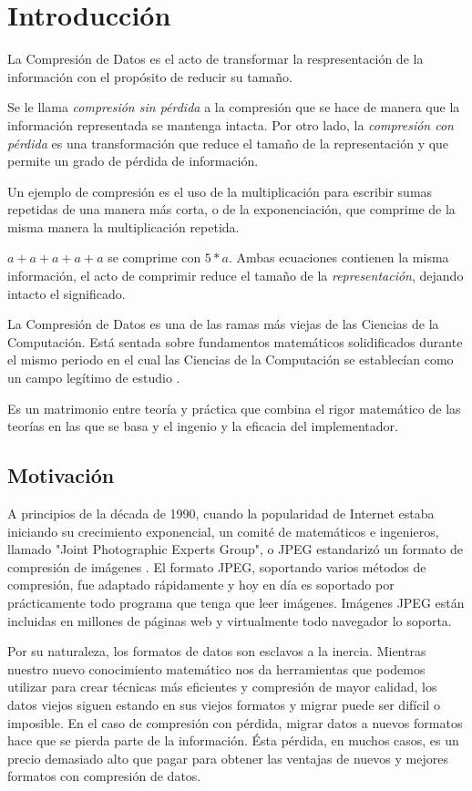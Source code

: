 \chapter{Introducción}\label{ch:introduction}


La \gls{Compresión de Datos} es el acto de transformar la respresentación de la
información con el propósito de reducir su tamaño.

Se le llama \emph{compresión sin pérdida} a la compresión que se hace de manera
que la información representada se mantenga intacta. Por otro lado, la
\emph{compresión con pérdida} es una transformación que reduce el tamaño de la
representación y que permite un grado de pérdida de información.

Un ejemplo de compresión es el uso de la multiplicación para escribir sumas
repetidas de una manera más corta, o de la exponenciación, que comprime de la
misma manera la multiplicación repetida.

$ a + a + a + a + a $ se comprime con $ 5 * a $. Ambas ecuaciones contienen la
misma información, el acto de comprimir reduce el tamaño de la
\emph{representación}, dejando intacto el significado.

La Compresión de Datos es una de las ramas más viejas de las Ciencias de la
Computación. Está sentada sobre fundamentos matemáticos solidificados durante
el mismo periodo en el cual las Ciencias de la Computación se establecían como
un campo legítimo de estudio \cite{cs_the_discipline}.

Es un matrimonio entre teoría y práctica que combina el rigor matemático de las
teorías en las que se basa y el ingenio y la eficacia del implementador.

\section{Motivación}

A principios de la década de 1990, cuando la popularidad de Internet estaba
iniciando su crecimiento exponencial, un comité de matemáticos e ingenieros,
llamado "Joint Photographic Experts Group", o \gls{JPEG} estandarizó un formato de
compresión de imágenes \cite{jpeg-spec}. El formato JPEG, soportando varios
métodos de compresión, fue adaptado rápidamente y hoy en día es soportado por
prácticamente todo programa que tenga que leer imágenes. Imágenes JPEG están
incluidas en millones de páginas web y virtualmente todo navegador lo soporta.

Por su naturaleza, los formatos de datos son esclavos a la inercia. Mientras
nuestro nuevo conocimiento matemático nos da herramientas que podemos utilizar
para crear técnicas más eficientes y compresión de mayor calidad, los datos
viejos siguen estando en sus viejos formatos y migrar puede ser difícil o
imposible. En el caso de compresión con pérdida, migrar datos a nuevos formatos
hace que se pierda parte de la información. Ésta pérdida, en muchos casos, es
un precio demasiado alto que pagar para obtener las ventajas de nuevos y
mejores formatos con compresión de datos.

